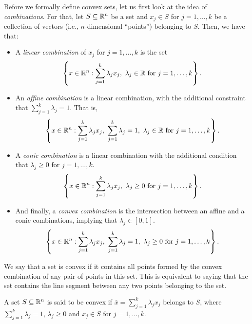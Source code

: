 Before we formally define convex sets, let us first look at the idea of \emph{combinations}. For that, let $S \subseteq \mathbb{R}^n$ be a set and $x_j \in S$ for $j=1,\dots,k$ be a collection of vectors (i.e., $n$-dimensional ``points'') belonging to $S$. Then, we have that:
%
\begin{itemize} 
	\item A \emph{linear combination} of $x_j$ for $j=1,\dots, k$ is the set 
%
	\begin{align}
		\left\{ x \in \mathbb{R}^n : \sum_{j=1}^k \lambda_jx_j, \ \lambda_j \in \mathbb{R} \text{ for } j=1,\dots, k \right \}.
	\end{align}
%
	\item An \emph{affine combination} is a linear combination, with the additional constraint that $\sum_{j=1}^k \lambda_j = 1$. That is,
%
	\begin{align}
		\braces{x \in \reals^n : \sum_{j=1}^k \lambda_jx_j, \ \sum_{j=1}^k \lambda_j = 1, \ \lambda_j \in \reals \text{ for } j=1, \dots, k}.
	\end{align}
%
	\item A \emph{conic combination} is a linear combination with the additional condition that $\lambda_j \geq 0$ for $j = 1,\dots,k$.
%
	\begin{align}
		\left\{ x \in \mathbb{R}^n : \sum_{j=1}^k \lambda_jx_j, \ \lambda_j \geq 0 \text{ for } j=1,\dots,k \right \}.
	\end{align}
%
	\item And finally, a \emph{convex combination} is the intersection between an affine and a conic combinations, implying that $\lambda_j \in [0,1]$.  
%
	\begin{align}
		\braces{x \in \reals^n : \sum_{j=1}^k \lambda_jx_j, \ \sum_{j=1}^k \lambda_j = 1, \ \lambda_j \geq 0 \text{ for } j=1,\dots,k}.
	\end{align}
% 
\end{itemize}

We say that a set is convex if it contains all points formed by the convex combination of any pair of points in this set. This is equivalent to saying that the set contains the line segment between any two points belonging to the set. 

\begin{definition} \label{def:convex_sets}
	A set $S \subseteq \mathbb{R}^n$ is said to be convex if $\overline{x} = \sum_{j=1}^k \lambda_jx_j$ belongs to $S$, where $\sum_{j=1}^k \lambda_j = 1$, $\lambda_j \geq 0$ and $x_j \in S$ for $j=1,\dots, k$.
\end{definition}

